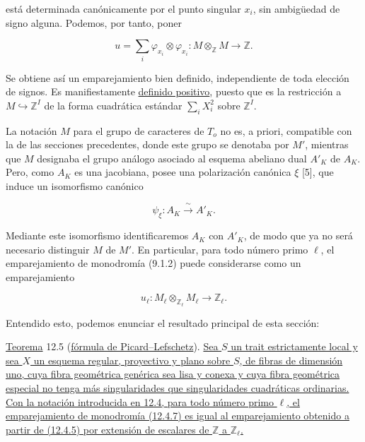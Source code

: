 \noindent
está determinada canónicamente por el punto singular $x_i$, sin
ambigüedad de signo alguna. Podemos, por tanto, poner

\begin{equation}\tag{12.4.5}
 u=\sum_i\varphi_{x_i}\otimes\varphi_{x_i}:
 M\otimes_{\mathbb Z}M\longrightarrow\mathbb Z.
\end{equation}

Se obtiene así un emparejamiento bien definido, independiente de toda
elección de signos. Es manifiestamente \underline{definido positivo},
puesto que es la restricción a $M\hookrightarrow\mathbb Z^I$ de la forma
cuadrática estándar $\sum_i X_i^2$ sobre $\mathbb Z^I$.


La notación $M$ para el grupo de caracteres de $T_o$ no es, a priori,
compatible con la de las secciones precedentes, donde este grupo se
denotaba por $M'$, mientras que $M$ designaba el grupo análogo asociado
al esquema abeliano dual $A'_K$ de $A_K$. Pero, como $A_K$ es una
jacobiana, posee una polarización canónica $\xi$ [5]\sisi{\hspace{2em}}{},
que induce un isomorfismo canónico

\begin{equation}\tag{12.4.6}
 \psi_\xi:A_K\xrightarrow{\ \sim\ }A'_K.
\end{equation}

\noindent
Mediante este isomorfismo identificaremos $A_K$ con $A'_K$, de modo que
ya no será necesario distinguir $M$ de $M'$. En particular, para todo
número primo $\ell$, el emparejamiento de monodromía (9.1.2) puede
considerarse como un emparejamiento

\begin{equation}\tag{12.4.7}
 u_\ell:M_\ell\otimes_{\mathbb Z_\ell}M_\ell
 \longrightarrow\mathbb Z_\ell.
\end{equation}

Entendido esto, podemos enunciar el resultado principal de esta sección:

\medskip
\noindent
\underline{Teorema} 12.5 (\underline{fórmula de Picard--Lefschetz}).
\underline{Sea $S$ un trait estrictamente local y sea $X$ un esquema
regular, proyectivo y plano sobre $S$, de fibras de dimensión uno, cuya
fibra geométrica genérica sea lisa y conexa y cuya fibra geométrica
especial no tenga más singularidades que singularidades cuadráticas
ordinarias. Con la notación introducida en 12.4, para todo número primo
$\ell$, el emparejamiento de monodromía (12.4.7) es igual al
emparejamiento obtenido a partir de (12.4.5) por extensión de escalares
de $\mathbb Z$ a $\mathbb Z_\ell$.}
